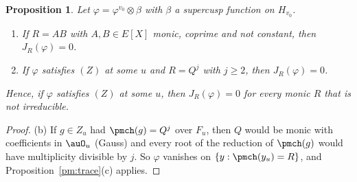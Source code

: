 \documentclass[10pt]{amsart}
\newtheorem{proposition}[theorem]{Proposition}
\theoremstyle{definition}
\theoremstyle{remark}
\begin{document}
\begin{proposition}\label{pm:red}
Let $\varphi=\varphi^{v_0}\otimes\beta$ with $\beta$ a supercusp function on $H_{v_0}$.
\begin{enumerate}
\item[(a)] If $R=AB$ with $A,B\in E[X]$ monic, coprime and not constant, then $J_R(\varphi)=0$.
\item[(b)] If $\varphi$ satisfies $(Z)$ at some $u$ and $R=Q^j$ with $j\ge2$, then $J_R(\varphi)=0$.
\end{enumerate}
Hence, if $\varphi$ satisfies $(Z)$ at some $u$, then $J_R(\varphi)=0$ for every monic $R$ that
is not irreducible.
\end{proposition}
\begin{proof}
(b) If $g\in Z_u$ had $\pmch(g)=Q^j$ over $F_u$, then $Q$ would be monic with coefficients in
$\auO_u$ (Gauss) and every root of the reduction of $\pmch(g)$ would have multiplicity divisible
by $j$. So $\varphi$ vanishes on $\{y:\pmch(y_u)=R\}$, and Proposition~\ref{pm:trace}(c) applies.


\end{proof}
\end{document}
